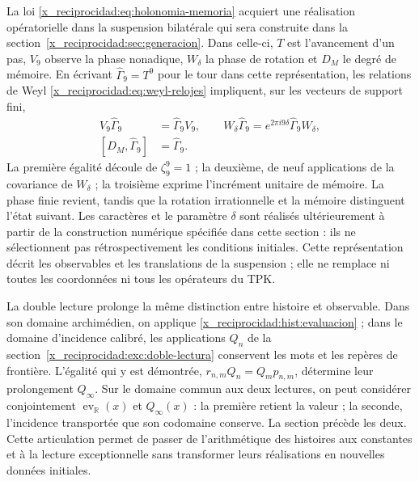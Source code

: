 La loi \eqref{x_reciprocidad:eq:holonomia-memoria} acquiert une réalisation opératorielle
dans la suspension bilatérale qui sera construite dans la
section~\ref{x_reciprocidad:sec:generacion}. Dans celle-ci, \(T\) est l’avancement d’un pas,
\(V_9\) observe la phase nonadique, \(W_\delta\) la phase de rotation et
\(D_M\) le degré de mémoire. En écrivant
\(\widehat\Gamma_9=T^9\) pour le tour dans cette représentation,
les relations de Weyl \eqref{x_reciprocidad:eq:weyl-relojes} impliquent, sur les vecteurs
de support fini,
\begin{equation}
 \begin{aligned}
 V_9\widehat\Gamma_9&=\widehat\Gamma_9V_9,\qquad
 W_\delta\widehat\Gamma_9=e^{2\pi i9\delta}
     \widehat\Gamma_9W_\delta,\\
 [D_M,\widehat\Gamma_9]&=\widehat\Gamma_9.
 \end{aligned}
 \label{x_reciprocidad:hist:tres-retornos}
\end{equation}
La première égalité découle de \(\zeta_9^9=1\) ; la deuxième, de neuf
applications de la covariance de \(W_\delta\) ; la troisième exprime
l’incrément unitaire de mémoire. La phase finie revient, tandis que la
rotation irrationnelle et la mémoire distinguent l’état suivant. Les
caractères et le paramètre \(\delta\) sont réalisés ultérieurement à partir de la
construction numérique spécifiée dans cette section : ils ne sélectionnent pas rétrospectivement
les conditions initiales. Cette représentation décrit les observables et les translations de
la suspension ; elle ne remplace ni toutes les coordonnées ni tous les opérateurs
du TPK.

La double lecture prolonge la même distinction entre histoire et observable.
Dans son domaine archimédien, on applique \eqref{x_reciprocidad:hist:evaluacion} ; dans le
domaine d’incidence calibré, les applications \(Q_n\) de la
section~\ref{x_reciprocidad:exc:doble-lectura} conservent les mots et les repères de
frontière. L’égalité qui y est démontrée,
\(r_{n,m}Q_n=Q_mp_{n,m}\), détermine leur prolongement \(Q_\infty\).
Sur le domaine commun aux deux lectures, on peut considérer conjointement
\(\operatorname{ev}_{\mathbb R}(x)\) et \(Q_\infty(x)\) : la
première retient la valeur ; la seconde, l’incidence transportée que son
codomaine conserve. La section précède les deux. Cette articulation permet
de passer de l’arithmétique des histoires aux constantes et à la lecture
exceptionnelle sans transformer leurs réalisations en nouvelles données initiales.


